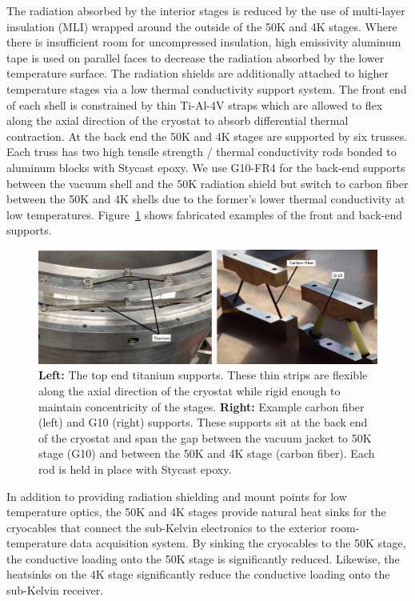 \documentclass[]{spie}  %
\begin{document}
The radiation absorbed by the interior stages is reduced by the use of
multi-layer insulation (MLI) wrapped around the outside of the 50K and 4K stages. Where
there is insufficient room for uncompressed insulation, high emissivity
aluminum tape is used on parallel faces to decrease the radiation absorbed by the lower
temperature surface. The radiation shields are additionally attached to higher temperature stages
via a low thermal conductivity support system. The front end of each shell is
constrained by thin Ti-Al-4V straps which are allowed to flex along the axial
direction of the cryostat to absorb differential thermal contraction. At the
back end the 50K and 4K stages are supported by six trusses. Each truss has two high
tensile strength / thermal conductivity rods bonded to aluminum blocks with
Stycast epoxy. We use G10-FR4 for the back-end supports between the vacuum
shell and the 50K radiation shield but switch to carbon fiber between the 50K
and 4K shells due to the former's lower thermal conductivity at low
temperatures. Figure~\ref{fig:supports} shows fabricated examples of the
front and back-end supports.

\begin{figure}[t]
	\center
	\includegraphics[scale=0.1]{supports.png}
	\caption{\textbf{Left:} The top end titanium supports. These thin strips
	are flexible along the axial direction of the cryostat while rigid enough
	to maintain concentricity of the stages. \textbf{Right:} Example carbon fiber (left) and G10 (right) supports. These
	supports sit at the back end of the cryostat and span the gap between the
	vacuum jacket to 50K stage (G10) and between the 50K and 4K stage (carbon
	fiber). Each rod is held in place with Stycast epoxy.}
	\label{fig:supports}
\end{figure}



In addition to providing radiation shielding and mount points for low
temperature optics, the 50K and 4K stages provide natural heat sinks for the
cryocables that connect the sub-Kelvin electronics to the exterior
room-temperature data acquisition system. By sinking the cryocables to the 50K
stage, the conductive loading onto the 50K stage is significantly reduced.
Likewise, the heatsinks on the 4K stage significantly reduce the conductive
loading onto the sub-Kelvin receiver. 
\end{document}
